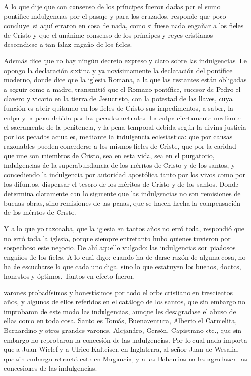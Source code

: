A lo que dije que con consenso de los príncipes fueron dadas por el sumo pontífice indulgencias por el pasaje y para los cruzados, responde que poco concluye, si aquí erraron en cosa de nada, como si fuese nada engañar a los fieles de Cristo y que el unánime consenso de los príncipes y reyes cristianos descendiese a tan falaz engaño de los fieles.

Además dice que no hay ningún decreto expreso y claro sobre las indulgencias. Le opongo la declaración sixtina y ya novísimamente la declaración del pontífice moderno, donde dice que la iglesia Romana, a la que las restantes están obligadas a seguir como a madre, transmitió que el Romano pontífice, sucesor de Pedro el clavero y vicario en la tierra de Jesucristo, con la potestad de las llaves, cuya función es abrir quitando en los fieles de Cristo sus impedimentos, a saber, la culpa y \marginpar{\small[353]} la pena debida por los pecados actuales. La culpa ciertamente mediante el sacramento de la penitencia, y la pena temporal debida según la divina justicia por los pecados actuales, mediante la indulgencia eclesiástica: que por causas razonables pueden concederse a los mismos fieles de Cristo, que por la caridad que une son miembros de Cristo, sea en esta vida, sea en el purgatorio, indulgencias de la superabundancia de los méritos de Cristo y de los santos, y concediendo la indulgencia por autoridad apostólica tanto por los vivos como por los difuntos, dispensar el tesoro de los méritos de Cristo y de los santos. Donde determina claramente con lo siguiente que las indulgencias no son remisiones de buenas obras, sino remisiones de las penas, que se hacen hecha la compensación de los méritos de Cristo.

Y a lo que yo razonaba, que la iglesia en tantos años no erró toda, respondió que no erró toda la iglesia, porque siempre entretanto hubo quienes tuvieron por sospechoso este negocio. De ahí aquello vulgado: las indulgencias son piadosos engaños de los fieles. A lo cual digo: cuando ha de darse razón de alguna cosa, no ha de escucharse lo que cada uno diga, sino lo que estatuyen los buenos, doctos, honestos y óptimos. Tantos en efecto fueron

varones probadísimos y honestísimos por todo el orbe cristiano en trescientos años, y algunos de ellos referidos en el catálogo de los santos, que sin embargo no improbaron de este modo las indulgencias, aunque les desagradase el abuso de ellas como en toda cosa. Santo es Tomás, Buenaventura, Alberto el Carmelita, Bernardino y otros grandes varones, Alejandro, Gersón, Capistrano etc., que sin embargo no reprobaron la concesión de las indulgencias. Por lo cual nada importa que a Juan Wiclef y a Ulrico Kalteisen en Inglaterra, al señor Juan de Wesalia, que sin embargo retractó esto en Maguncia, y a los Bohemios no les agradasen las concesiones de las indulgencias.

